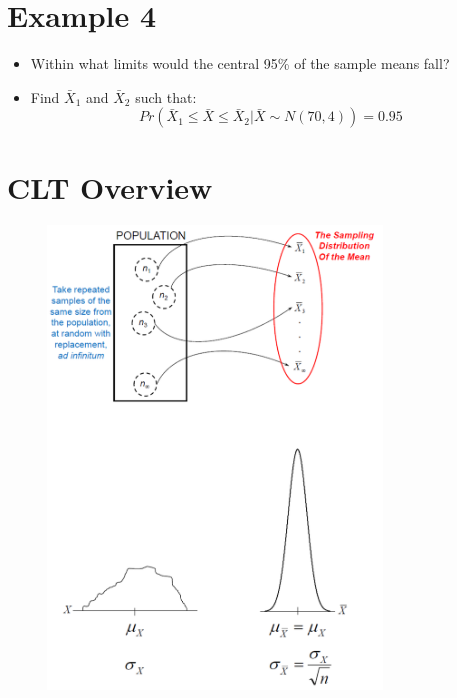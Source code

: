\documentclass[12pt]{article}
\begin{document}
\section{Example 4}\label{example-4}

\begin{itemize}
\itemsep1pt\parskip0pt
\item
  Within what limits would the central 95\% of the sample means fall?
\item
  Find \(\bar{X}_{1}\) and \(\bar{X}_{2}\) such that:
  \[ Pr (\bar{X}_{1} \leq \bar{X} \leq \bar{X}_{2} | \bar{X} \sim N(70, 4)) = 0.95 \]
\end{itemize}

\section{CLT Overview}\label{clt-overview}

\begin{figure}[H]
\centering
\includegraphics[width=3.5in]{CLT_overview.png}
\caption{}
\end{figure}
\end{document}
